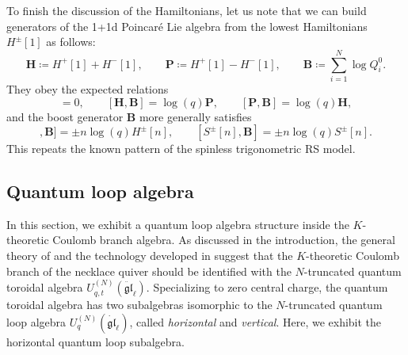 To finish the discussion of the Hamiltonians, let us note that we can build generators of the 1+1d Poincaré Lie algebra from the lowest Hamiltonians $H^\pm[1]$ as follows:
\begin{equation}
    \mathbf{H} \coloneq H^+[1] + H^-[1], \qquad \mathbf{P} \coloneq H^+[1] - H^-[1], \qquad \mathbf{B} \coloneq \sum_{i=1}^N \log Q_i^0.
\end{equation}
They obey the expected relations
\begin{equation}
    [\mathbf{H},\mathbf{P}] = 0, \qquad [\mathbf{H},\mathbf{B}] = \log(q) \mathbf{P}, \qquad [\mathbf{P},\mathbf{B}] = \log(q) \mathbf{H},
\end{equation}
and the boost generator $\mathbf{B}$ more generally satisfies
\begin{equation}
    [H^\pm[n],\mathbf{B}] = \pm n \log(q) H^\pm[n], \qquad [S^\pm[n],\mathbf{B}] = \pm n \log(q) S^\pm[n].
\end{equation}
This repeats the known pattern of the spinless trigonometric RS model.

\subsection{Quantum loop algebra}\label{sec:quantumLoopAlg}

In this section, we exhibit a quantum loop algebra structure inside the $K$-theoretic Coulomb branch algebra. As discussed in the introduction, the general theory of \cite[appendix B]{braverman_coulomb_2018} and the technology developed in \cite{tsymbaliuk_difference_2023} suggest that the $K$-theoretic Coulomb branch of the necklace quiver should be identified with the $N$-truncated quantum toroidal algebra $U_{q,t}^{(N)}(\ddot{\mathfrak{gl}}_\ell)$. Specializing to zero central charge, the quantum toroidal algebra has two subalgebras isomorphic to the $N$-truncated quantum loop algebra $U_q^{(N)}(\dot{\mathfrak{gl}}_\ell)$, called \emph{horizontal} and \emph{vertical}. Here, we exhibit the horizontal quantum loop subalgebra.


